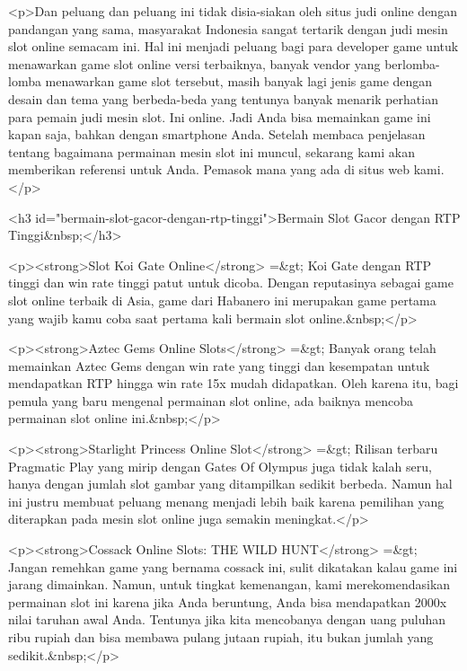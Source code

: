{<p>Dan peluang dan peluang ini tidak disia-siakan oleh situs judi online dengan pandangan yang sama, masyarakat Indonesia sangat tertarik dengan judi mesin slot online semacam ini. Hal ini menjadi peluang bagi para developer game untuk menawarkan game slot online versi terbaiknya, banyak vendor yang berlomba-lomba menawarkan game slot tersebut, masih banyak lagi jenis game dengan desain dan tema yang berbeda-beda yang tentunya banyak menarik perhatian para pemain judi mesin slot. Ini online. Jadi Anda bisa memainkan game ini kapan saja, bahkan dengan smartphone Anda. Setelah membaca penjelasan tentang bagaimana permainan mesin slot ini muncul, sekarang kami akan memberikan referensi untuk Anda. Pemasok mana yang ada di situs web kami.</p>



<h3 id="bermain-slot-gacor-dengan-rtp-tinggi">Bermain Slot Gacor dengan RTP Tinggi&nbsp;</h3>



<p><strong>Slot Koi Gate Online</strong> =&gt; Koi Gate dengan RTP tinggi dan win rate tinggi patut untuk dicoba. Dengan reputasinya sebagai game slot online terbaik di Asia, game dari Habanero ini merupakan game pertama yang wajib kamu coba saat pertama kali bermain slot online.&nbsp;</p>



<p><strong>Aztec Gems Online Slots</strong> =&gt; Banyak orang telah memainkan Aztec Gems dengan win rate yang tinggi dan kesempatan untuk mendapatkan RTP hingga win rate 15x mudah didapatkan. Oleh karena itu, bagi pemula yang baru mengenal permainan slot online, ada baiknya mencoba permainan slot online ini.&nbsp;</p>



<p><strong>Starlight Princess Online Slot</strong> =&gt; Rilisan terbaru Pragmatic Play yang mirip dengan Gates Of Olympus juga tidak kalah seru, hanya dengan jumlah slot gambar yang ditampilkan sedikit berbeda. Namun hal ini justru membuat peluang menang menjadi lebih baik karena pemilihan yang diterapkan pada mesin slot online juga semakin meningkat.</p>



<p><strong>Cossack Online Slots: THE WILD HUNT</strong> =&gt; Jangan remehkan game yang bernama cossack ini, sulit dikatakan kalau game ini jarang dimainkan. Namun, untuk tingkat kemenangan, kami merekomendasikan permainan slot ini karena jika Anda beruntung, Anda bisa mendapatkan 2000x nilai taruhan awal Anda. Tentunya jika kita mencobanya dengan uang puluhan ribu rupiah dan bisa membawa pulang jutaan rupiah, itu bukan jumlah yang sedikit.&nbsp;</p>



}
